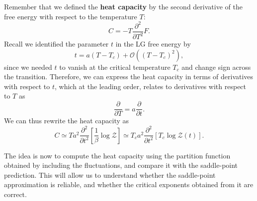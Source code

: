 Remember that we defined the \textbf{heat capacity} by the second derivative of the free energy with respect to the temperature \( T \):
\[
    C = -T \frac{\partial^2}{\partial T^2} F.
\]
Recall we identified the parameter \( t \) in the LG free energy by
\[
    t = a(T - T_c) + \mathcal{O}((T - T_c)^2),
\]
since we needed \( t \) to vanish at the critical temperature \( T_c \) and change sign across the transition. Therefore, we can express the heat capacity in terms of derivatives with respect to \( t \), which at the leading order, relates to derivatives with respect to \( T \) as
\[
    \frac{\partial}{\partial T} = a \frac{\partial}{\partial t}.
\]
We can thus rewrite the heat capacity as
\[
    C \simeq T a^2 \frac{\partial^2}{\partial t^2} \left[ \frac{1}{\beta} \log \mathcal{Z} \right] \simeq T_c a^2 \frac{\partial^2}{\partial t^2} \left[ T_c \log \mathcal{Z}(t) \right].
\]

The idea is now to compute the heat capacity using the partition function obtained by including the fluctuations, and compare it with the saddle-point prediction. This will allow us to understand whether the saddle-point approximation is reliable, and whether the critical exponents obtained from it are correct.


